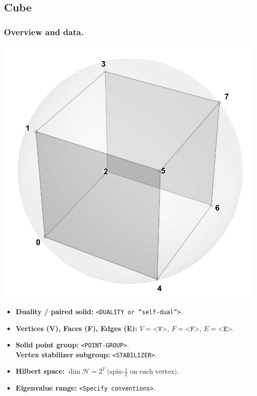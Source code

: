 \documentclass[11pt,a4paper]{article}
\begin{document}

\subsection*{Cube}

\subsubsection*{Overview and data.}
\begin{center}
  \includegraphics[width=.6\linewidth]{cube}
\end{center}

\begin{itemize}[leftmargin=1.5em]
  \item \textbf{Duality / paired solid:} \texttt{<DUALITY or “self-dual”>}.
  \item \textbf{Vertices (V), Faces (F), Edges (E):} $V=\texttt{<V>}$,\; $F=\texttt{<F>}$,\; $E=\texttt{<E>}$.
  \item \textbf{Solid point group:} \texttt{<POINT-GROUP>}.\\
        \textbf{Vertex stabilizer subgroup:} \texttt{<STABILIZER>}.
  \item \textbf{Hilbert space:} \(
        \dim\mathcal{H} = 2^{V}\ \text{(spin-$\tfrac12$ on each vertex).}
        \)
  \item \textbf{Eigenvalue range:} \texttt{<Specify conventions>}.
\end{itemize}
\end{document}
